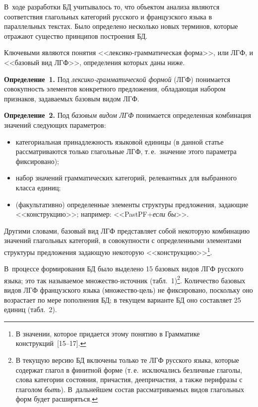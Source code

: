 \begin{multicols}{2}
  В~ходе разработки БД учитывалось то, что объектом анализа являются
соответствия глагольных категорий русского и французского языка в
параллельных текстах. Было определено несколько новых терминов, которые
отражают существо принципов построения БД.

  Ключевыми являются понятия <<лек\-си\-ко-грам\-ма\-ти\-че\-ская форма>>,
или ЛГФ, и <<базовый вид ЛГФ>>, определения которых даны ниже.

  \medskip

  \noindent
  \textbf{Определение~1.} Под \textit{лек\-си\-ко-грам\-ма\-ти\-че\-ской
формой} (ЛГФ) понимается совокупность элементов конкретного предложения,
обладающая набором признаков, задаваемых базовым видом ЛГФ.

  \medskip

  \noindent
  \textbf{Определение~2.} Под \textit{базовым видом ЛГФ} понимается
определенная комбинация значений следующих параметров:
  \begin{itemize}
\item категориальная принадлежность языковой единицы (в данной статье
рассматриваются только глагольные ЛГФ, т.\,е.\ значение этого параметра
фиксировано);
\item набор значений грамматических категорий, релевантных для
выбранного класса единиц;
\item (факультативно) определенные элементы структуры предложения,
задающие <<конструкцию>>; например: <<PastPF\;+\;\textit{если бы}>>.
\end{itemize}

  Другими словами, базовый вид ЛГФ пред\-став\-ля\-ет собой некоторую
комбинацию значений глагольных категорий, в совокупности с определенными
элементами структуры предложения задающую некоторую
<<конструкцию>>\footnote{В значении, которое придается этому понятию в
Грамматике конструкций~[15--17].}.

  В~процессе формирования БД было выделено 15 базовых видов ЛГФ
русского языка; это так называемое мно\-же\-ст\-во-ис\-точ\-ник
(табл.~1)\footnote{В текущую версию БД включены только те ЛГФ
русского языка, которые содержат глагол в финитной форме (т.\,е.\
исключались безличные глаголы, слова категории состояния, причастия,
деепричастия, а также перифразы с глаголом \textit{быть}). В~дальнейшем
состав рассматриваемых видов глагольных форм будет расширяться.}.
Количество базовых видов ЛГФ французского языка (мно\-же\-ст\-во-цель) не
фиксировано, поскольку оно возрастает по мере пополнения БД; в текущем
варианте БД оно составляет 25 единиц (табл.~2).




\end{multicols}
